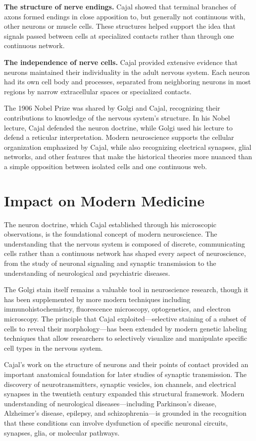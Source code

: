 \textbf{The structure of nerve endings.} Cajal showed that terminal branches of axons formed endings in close apposition to, but generally not continuous with, other neurons or muscle cells. These structures helped support the idea that signals passed between cells at specialized contacts rather than through one continuous network.

\textbf{The independence of nerve cells.} Cajal provided extensive evidence that neurons maintained their individuality in the adult nervous system. Each neuron had its own cell body and processes, separated from neighboring neurons in most regions by narrow extracellular spaces or specialized contacts.

The 1906 Nobel Prize was shared by Golgi and Cajal, recognizing their contributions to knowledge of the nervous system's structure. In his Nobel lecture, Cajal defended the neuron doctrine, while Golgi used his lecture to defend a reticular interpretation. Modern neuroscience supports the cellular organization emphasized by Cajal, while also recognizing electrical synapses, glial networks, and other features that make the historical theories more nuanced than a simple opposition between isolated cells and one continuous web.\cite{golgi-lecture,cajal-lecture}

\section{Impact on Modern Medicine}

The neuron doctrine, which Cajal established through his microscopic observations, is the foundational concept of modern neuroscience. The understanding that the nervous system is composed of discrete, communicating cells rather than a continuous network has shaped every aspect of neuroscience, from the study of neuronal signaling and synaptic transmission to the understanding of neurological and psychiatric diseases.

The Golgi stain itself remains a valuable tool in neuroscience research, though it has been supplemented by more modern techniques including immunohistochemistry, fluorescence microscopy, optogenetics, and electron microscopy. The principle that Cajal exploited---selective staining of a subset of cells to reveal their morphology---has been extended by modern genetic labeling techniques that allow researchers to selectively visualize and manipulate specific cell types in the nervous system.

Cajal's work on the structure of neurons and their points of contact provided an important anatomical foundation for later studies of synaptic transmission. The discovery of neurotransmitters, synaptic vesicles, ion channels, and electrical synapses in the twentieth century expanded this structural framework. Modern understanding of neurological diseases---including Parkinson's disease, Alzheimer's disease, epilepsy, and schizophrenia---is grounded in the recognition that these conditions can involve dysfunction of specific neuronal circuits, synapses, glia, or molecular pathways.


